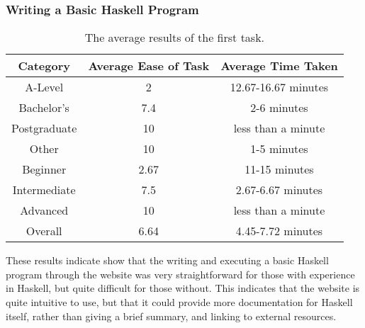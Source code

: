 \documentclass[../main.tex]{subfiles}
\begin{document}
            \subsubsection{Writing a Basic Haskell Program}
                \begin{table}[H]
                    \centering
                    \begin{tabular}{c|c|c}
                        \textbf{Category} & \textbf{Average Ease of Task} & \textbf{Average Time Taken} \\
                        \hline
                        A-Level           & 2                             & 12.67-16.67 minutes         \\
                        Bachelor's        & 7.4                           & 2-6 minutes                 \\
                        Postgraduate      & 10                            & less than a minute          \\
                        Other             & 10                            & 1-5 minutes                 \\
                        \hline
                        Beginner          & 2.67                          & 11-15 minutes               \\
                        Intermediate      & 7.5                           & 2.67-6.67 minutes           \\
                        Advanced          & 10                            & less than a minute          \\
                        \hline
                        Overall           & 6.64                          & 4.45-7.72 minutes           \\
                    \end{tabular}
                    \caption{The average results of the first task.}
                \end{table}

                These results indicate show that the writing and executing a basic Haskell
                    program through the website was very straightforward for those with experience
                    in Haskell, but quite difficult for those without.
                This indicates that the website is quite intuitive to use, but that it could
                    provide more documentation for Haskell itself, rather than giving a brief
                    summary, and linking to external resources.
\end{document}
